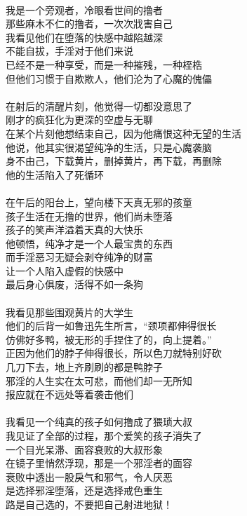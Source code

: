 \begin{poem}[不要把自己射进地狱]
    \begin{multicols}{2}
        \centering~\\
        我是一个旁观者，冷眼看世间的撸者 \\ 那些麻木不仁的撸者，一次次戕害自己 \\ 我看见他们在堕落的快感中越陷越深 \\ 不能自拔，手淫对于他们来说 \\ 已经不是一种享受，而是一种摧残，一种桎梏 \\ 但他们习惯于自欺欺人，他们沦为了心魔的傀儡 \\~\\
        在射后的清醒片刻，他觉得一切都没意思了 \\ 刚才的疯狂化为更深的空虚与无聊 \\ 在某个片刻他想结束自己，因为他痛恨这种无望的生活 \\ 他说，他其实很渴望纯净的生活，只是心魔袭脑 \\ 身不由己，下载黄片，删掉黄片，再下载，再删除 \\ 他的生活陷入了死循环 \\~\\
        在午后的阳台上，望向楼下天真无邪的孩童 \\ 孩子生活在无撸的世界，他们尚未堕落 \\ 孩子的笑声洋溢着天真的大快乐 \\ 他顿悟，纯净才是一个人最宝贵的东西 \\ 而手淫恶习无疑会剥夺纯净的财富 \\ 让一个人陷入虚假的快感中 \\ 最后身心俱废，活得不如一条狗 \\~\\
        我看见那些围观黄片的大学生 \\ 他们的后背一如鲁迅先生所言，“颈项都伸得很长 \\ 仿佛好多鸭，被无形的手捏住了的，向上提着。” \\ 正因为他们的脖子伸得很长，所以色刀就特别好砍 \\ 几刀下去，地上齐刷刷的都是鸭脖子 \\ 邪淫的人生实在太可悲，而他们却一无所知 \\ 报应就在不远处等着袭击他们 \\~\\
        我看见一个纯真的孩子如何撸成了猥琐大叔 \\ 我见证了全部的过程，那个爱笑的孩子消失了 \\ 一个目光呆滞、面容衰败的大叔形象 \\ 在镜子里悄然浮现，那是一个邪淫者的面容 \\ 衰败中透出一股戾气和邪气，令人厌恶 \\ 是选择邪淫堕落，还是选择戒色重生 \\ 路是自己选的，不要把自己射进地狱！
    \end{multicols}
\end{poem}

